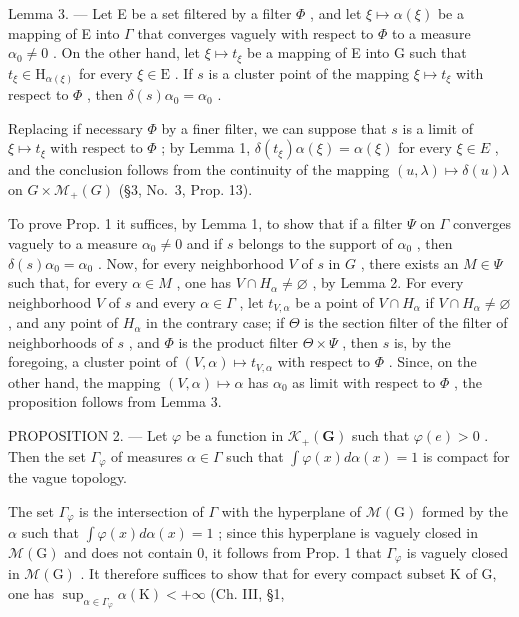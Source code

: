 Lemma 3. --- Let E be a set filtered by a filter \(\Phi\) , and let \(\xi \mapsto \alpha(\xi)\) be a mapping of E into \(\Gamma\) that converges vaguely with respect to \(\Phi\) to a measure \(\alpha_0 \neq 0\) . On the other hand, let \(\xi \mapsto t_{\xi}\) be a mapping of E into G such that \(t_{\xi} \in \mathrm{H}_{\alpha(\xi)}\) for every \(\xi \in \mathrm{E}\) . If \(s\) is a cluster point of the mapping \(\xi \mapsto t_{\xi}\) with respect to \(\Phi\) , then \(\delta(s)\alpha_0 = \alpha_0\) .

Replacing if necessary \(\Phi\) by a finer filter, we can suppose that \(s\) is a limit of \(\xi \mapsto t_{\xi}\) with respect to \(\Phi\) ; by Lemma 1, \(\delta(t_{\xi})\alpha(\xi) = \alpha(\xi)\) for every \(\xi \in E\) , and the conclusion follows from the continuity of the mapping \((u,\lambda) \mapsto \delta(u)\lambda\) on \(G \times \mathcal{M}_{+}(G)\) (§3, No.~3, Prop. 13).

To prove Prop. 1 it suffices, by Lemma 1, to show that if a filter \(\Psi\) on \(\Gamma\) converges vaguely to a measure \(\alpha_0 \neq 0\) and if \(s\) belongs to the support of \(\alpha_0\) , then \(\delta(s)\alpha_0 = \alpha_0\) . Now, for every neighborhood \(V\) of \(s\) in \(G\) , there exists an \(M \in \Psi\) such that, for every \(\alpha \in M\) , one has \(V \cap H_\alpha \neq \varnothing\) , by Lemma 2. For every neighborhood \(V\) of \(s\) and every \(\alpha \in \Gamma\) , let \(t_{V,\alpha}\) be a point of \(V \cap H_\alpha\) if \(V \cap H_\alpha \neq \varnothing\) , and any point of \(H_\alpha\) in the contrary case; if \(\Theta\) is the section filter of the filter of neighborhoods of \(s\) , and \(\Phi\) is the product filter \(\Theta \times \Psi\) , then \(s\) is, by the foregoing, a cluster point of \((V,\alpha) \mapsto t_{V,\alpha}\) with respect to \(\Phi\) . Since, on the other hand, the mapping \((V,\alpha) \mapsto \alpha\) has \(\alpha_0\) as limit with respect to \(\Phi\) , the proposition follows from Lemma 3.

PROPOSITION 2. --- Let \(\varphi\) be a function in \(\mathcal{K}_{+}(\mathbf{G})\) such that \(\varphi(e) > 0\) . Then the set \(\Gamma_{\varphi}\) of measures \(\alpha \in \Gamma\) such that \(\int \varphi(x) d\alpha(x) = 1\) is compact for the vague topology.

The set \(\Gamma_{\varphi}\) is the intersection of \(\Gamma\) with the hyperplane of \(\mathcal{M}(\mathrm{G})\) formed by the \(\alpha\) such that \(\int \varphi(x)d\alpha(x)=1\) ; since this hyperplane is vaguely closed in \(\mathcal{M}(\mathrm{G})\) and does not contain 0, it follows from Prop. 1 that \(\Gamma_{\varphi}\) is vaguely closed in \(\mathcal{M}(\mathrm{G})\) . It therefore suffices to show that for every compact subset K of G, one has \(\sup_{\alpha\in\Gamma_{\varphi}}\alpha(\mathrm{K})<+\infty\) (Ch. III, §1,

